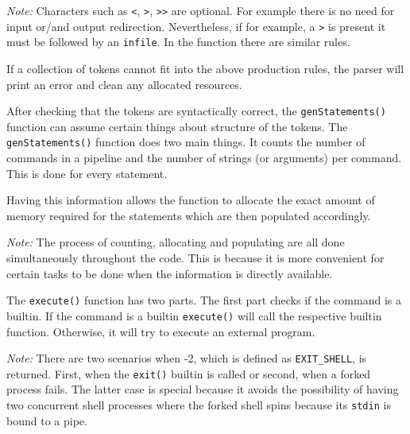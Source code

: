 \documentclass[12pt]{article}
\begin{document}
\textit{Note:} Characters such as \texttt{\textless},
\texttt{\textgreater}, \texttt{{\textgreater}{\textgreater}} are
optional. For example there is no need for input or/and output
redirection. Nevertheless, if for example, a
\texttt{\textgreater} is present it must be followed by an
\texttt{infile}. In the function there are similar rules.

If a collection of tokens cannot fit into the above production
rules, the parser will print an error and clean any allocated
resources.

After checking that the tokens are syntactically correct, the
\texttt{genStatements()} function can assume certain things
about structure of the tokens. The \texttt{genStatements()}
function does two main things. It counts the number of commands
in a pipeline and the number of strings (or arguments) per
command. This is done for every statement.

Having this information allows the function to allocate the
exact amount of memory required for the statements which are
then populated accordingly.

\textit{Note:} The process of counting, allocating and
populating are all done simultaneously throughout the code. This
is because it is more convenient for certain tasks to be done
when the information is directly available.

\newpage



The \texttt{execute()} function has two parts. The first part
checks if the command is a builtin. If the command is a builtin
\texttt{execute()} will call the respective builtin function.
Otherwise, it will try to execute an external program.

\textit{Note:} There are two scenarios when -2, which is
defined as \texttt{EXIT\_SHELL}, is returned. First, when the
\texttt{exit()} builtin is called or second, when a forked
process fails. The latter case is special because it avoids the
possibility of having two concurrent shell processes where the
forked shell spins because its \texttt{stdin} is bound to a
pipe.



\newpage
\end{document}

